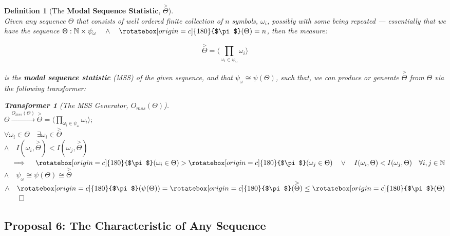 \documentclass[a4paper, 18pt]{book} %
\newtheorem{defn}{Definition}
\newtheorem{transf}{Transformer}
\newcommand{\invpi}{\rotatebox[origin=c]{180}{$\pi$}}
\begin{document}
\begin{appendices}
\vspace{1em}
\begin{defn}[The \textbf{Modal Sequence Statistic}, $\overset{>}{\Theta}$]
\label{DEFMSSFINb}
$ $\\
Given any sequence $\Theta$ that consists of well ordered finite collection of $n$ symbols, $\omega_i$, possibly with some being repeated --- essentially that we have the sequence $\Theta : \mathbb{N} \times \psi_{\omega} \quad \land \quad \invpi(\Theta) = n$, then the measure:

\vspace{1em}
\begin{equation}
\overset{>}{\Theta} = \langle \prod\limits_{\omega_i \in \psi_\omega} \omega_i \rangle 
\end{equation}
\vspace{1em}

is the \textbf{modal sequence statistic} (MSS) of the given sequence, and that $\psi_\omega \cong \psi(\Theta)$, such that, we can produce or generate $\overset{>}{\Theta}$ from $\Theta$ via the following transformer:

\vspace{1em}
\begin{transf}[The MSS Generator, $O_{mss}(\Theta)$]
\label{TRANSMSSGENb}
$ $\\
$\Theta \xrightarrow{O_{mss}(\Theta)} \overset{>}{\Theta} = \langle \prod\limits_{\omega_i \in \psi_\omega} \omega_i \rangle ;$\\
$\forall \omega_i \in \Theta \quad \exists \omega_i \in \overset{>}{\Theta}$\\
$\land \quad I(\omega_i,\overset{>}{\Theta}) < I(\omega_j,\overset{>}{\Theta})$\\ 
$\quad \implies \quad \invpi(\omega_i \in \Theta) > \invpi(\omega_j \in \Theta) \quad \lor \quad I(\omega_i,\Theta) < I(\omega_j, \Theta) \quad \forall i,j \in \mathbb{N}$\\
$\land \quad \psi_\omega \cong  \psi(\Theta) \cong \overset{>}{\Theta}$\\
$\land \quad \invpi(\psi(\Theta)) = \invpi(\overset{>}{\Theta}) \leq \invpi(\Theta)$
$\qed$
\end{transf}
\vspace{1em}


\end{defn}
\vspace{1em}


\subsection{Proposal 6: The Characteristic of Any Sequence\cite{lutalo_2025_trans_genetics}}
\label{PROP6}


\end{appendices}
\end{document}
